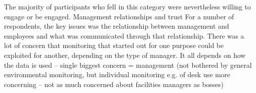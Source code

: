 The majority of participants who fell in this category were
nevertheless willing to engage or be engaged.  Management
relationships and trust For a number of respondents, the key issues
was the relationship between management and employees and what was
communicated through that relationship. There was a lot of concern
that monitoring that started out for one purpose could be exploited
for another, depending on the type of manager.  It all depends on how
the data is used – single biggest concern = management (not bothered
by general environmental monitoring, but individual monitoring e.g. of
desk use more concerning – not as much concerned about facilities
managers as bosses) 

